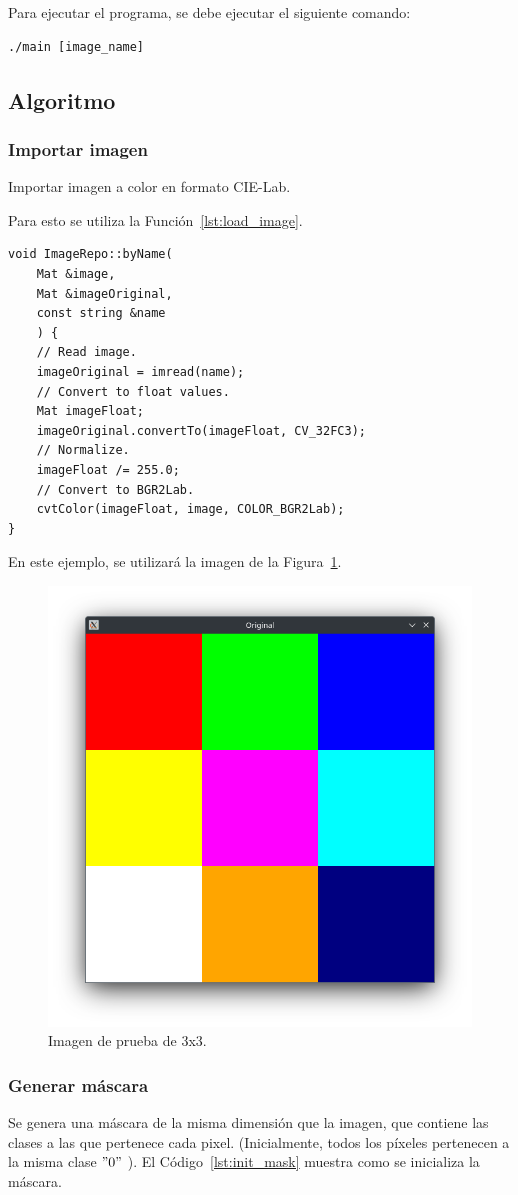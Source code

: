 Para ejecutar el programa, se debe ejecutar el siguiente comando:
\begin{lstlisting}[float=H,caption={Ejecution},label={lst:run}]
./main [image_name]
\end{lstlisting}


\subsection{Algoritmo}\label{subsec:algorithm}

\subsubsection{Importar imagen}\label{subsubsec:import-image}
Importar imagen a color en formato CIE-Lab.

Para esto se utiliza la Función~\ref{lst:load_image}.

\begin{lstlisting}[float=H,caption={Load Image},label={lst:load_image}]
void ImageRepo::byName(
    Mat &image,
    Mat &imageOriginal,
    const string &name
    ) {
    // Read image.
    imageOriginal = imread(name);
    // Convert to float values.
    Mat imageFloat;
    imageOriginal.convertTo(imageFloat, CV_32FC3);
    // Normalize.
    imageFloat /= 255.0;
    // Convert to BGR2Lab.
    cvtColor(imageFloat, image, COLOR_BGR2Lab);
}
\end{lstlisting}

En este ejemplo, se utilizará la imagen de la Figura~\ref{fig:test_img_3x3}.

\begin{figure}[H]
    \centering
    \includegraphics[width=.3\textwidth]{./latex/img/original}
    \caption{Imagen de prueba de 3x3.}
    \label{fig:test_img_3x3}
\end{figure}

\subsubsection{Generar máscara}\label{subsubsec:generate-mask}
Se genera una máscara de la misma dimensión que la imagen, que contiene las clases a las que pertenece cada pixel.
(Inicialmente, todos los píxeles pertenecen a la misma clase \("0"\) ).
El Código~\ref{lst:init_mask} muestra como se inicializa la máscara.

